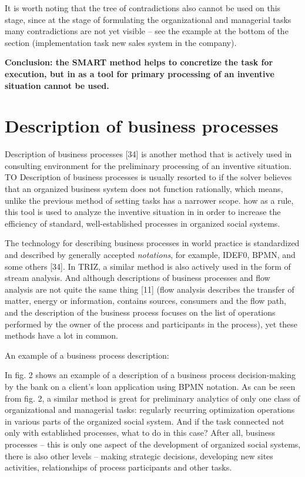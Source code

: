 It is worth noting that the tree of contradictions also cannot be used on this
stage, since at the stage of formulating the organizational and managerial
tasks many contradictions are not yet visible -- see the example at the bottom
of the section (implementation task new sales system in the company).

\textbf{Conclusion: the SMART method helps to concretize the task for
  execution, but in as a tool for primary processing of an inventive situation
  cannot be used.}

\section{Description of business processes}

Description of business processes [34] is another method that is actively used
in consulting environment for the preliminary processing of an inventive
situation. TO Description of business processes is usually resorted to if the
solver believes that an organized business system does not function
rationally, which means, unlike the previous method of setting tasks has a
narrower scope. how as a rule, this tool is used to analyze the inventive
situation in in order to increase the efficiency of standard, well-established
processes in organized social systems.

The technology for describing business processes in world practice is
standardized and described by generally accepted \emph{notations}, for
example, IDEF0, BPMN, and some others [34].  In TRIZ, a similar method is also
actively used in the form of stream analysis. And although descriptions of
business processes and flow analysis are not quite the same thing [11] (flow
analysis describes the transfer of matter, energy or information, contains
sources, consumers and the flow path, and the description of the business
process focuses on the list of operations performed by the owner of the
process and participants in the process), yet these methods have a lot in
common.

An example of a business process description:


In fig. 2 shows an example of a description of a business process
decision-making by the bank on a client’s loan application using BPMN
notation. As can be seen from fig.  2, a similar method is great for
preliminary analytics of only one class of organizational and managerial
tasks: regularly recurring optimization operations in various parts of the
organized social system. And if the task connected not only with established
processes, what to do in this case? After all, business processes -- this is
only one aspect of the development of organized social systems, there is also
other levels -- making strategic decisions, developing new sites activities,
relationships of process participants and other tasks.

